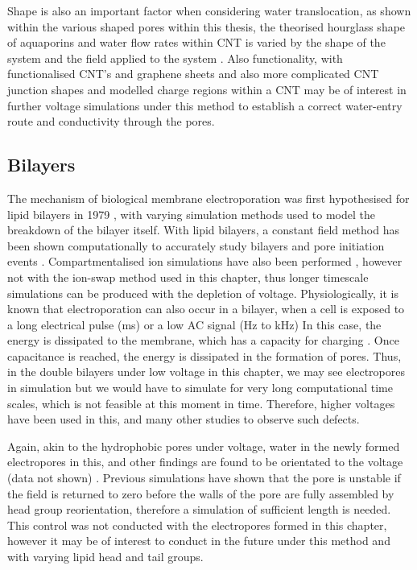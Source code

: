 Shape is also an important factor when considering water translocation, as shown within the various shaped pores within this thesis, the theorised hourglass shape of aquaporins \cite{Gravelle2013} and water flow rates within CNT is varied by the shape of the system and the field applied to the system \cite{Wang2011}. Also functionality, with functionalised CNT's and graphene sheets \cite{Striolo2006} and also more complicated CNT junction shapes \cite{Tu2009} and modelled charge regions within a CNT \cite{Lu2013f} may be of interest in further voltage simulations under this method to establish a correct water-entry route and conductivity through the pores. 

\subsection{Bilayers}


The mechanism of biological membrane electroporation was first hypothesised for lipid bilayers in 1979 \cite{Abiror1979}, with varying simulation methods used to model the breakdown of the bilayer itself. With lipid bilayers, a constant field method has been shown computationally to accurately study bilayers and pore initiation events \cite{Gumbart2012}. Compartmentalised ion simulations have also been performed \cite{Vernier2006a}, however not with the ion-swap method used in this chapter, thus longer timescale simulations can be produced with the depletion of voltage. Physiologically, it is known that electroporation can also occur in a bilayer, when a cell is exposed to a long electrical pulse (ms) or a low AC signal (Hz to kHz) In this case, the energy is dissipated to the membrane, which has a capacity for charging \cite{Cole1937}. Once capacitance is reached, the energy is dissipated in the formation of pores. Thus, in the double bilayers under low voltage in this chapter, we may see electropores in simulation but we would have to simulate for very long computational time scales, which is not feasible at this moment in time. Therefore, higher voltages have been used in this, and many other studies to observe such defects. 

Again, akin to the hydrophobic pores under voltage, water in the newly formed electropores in this, and other findings are found to be orientated to the voltage (data not shown) \cite{Vernier2007,Hu2013c}. Previous simulations have shown that the pore is unstable if the field is returned to zero before the walls of the pore are fully assembled by head group reorientation, therefore a simulation of sufficient length is needed. This control was not conducted with the electropores formed in this chapter, however it may be of interest to conduct in the future under this method and with varying lipid head and tail groups.

